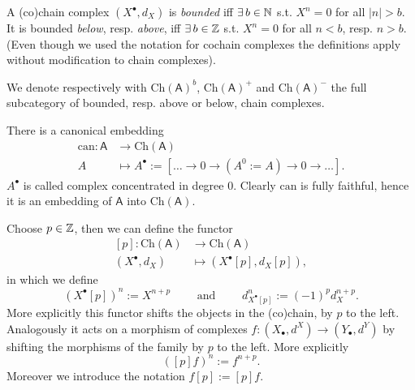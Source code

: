\begin{defn}
	A (co)chain complex $\left(X^{\bullet}, d_X\right)$ is {\em bounded} iff
	$\exists\, b \in \mathbb{N}$ s.t. $X^n = 0$ for all $\left| n \right| > b$.
	It is bounded {\em below}, resp. {\em above}, iff
	$\exists\, b \in \mathbb{Z}$ s.t. $X^n = 0$ for all
	$n < b$, resp. $n > b$.
	(Even though we used the notation for cochain complexes the definitions apply without
	modification to chain complexes).

	We denote respectively with $\mathrm{Ch}(\mathsf{A})^b$, $\mathrm{Ch}(\mathsf{A})^+$
	and $\mathrm{Ch}(\mathsf{A})^-$ the full subcategory of bounded, resp. above or below, chain complexes.
\end{defn}

\begin{defn}
	There is a canonical embedding
	\begin{align}
		\mathrm{can}: \mathsf{A} &\to \mathrm{Ch}(\mathsf{A}) \\
		A &\mapsto A^{\bullet} := \left[ 
		\ldots \to 0 \to (A^0 := A) \to 0 \to \ldots \right]
	.\end{align} 
	$A^{\bullet}$ is called complex concentrated in degree $0$.
	Clearly $\mathrm{can}$ is fully faithful, hence it is an embedding of $\mathsf{A}$ into $\mathrm{Ch}(\mathsf{A})$.
\end{defn}

\begin{defn}
	Choose $p \in \mathbb{Z}$, then we can define the functor
	\begin{align}
		\left[ p \right]: \mathrm{Ch}(\mathsf{A}) &\to \mathrm{Ch}(\mathsf{A}) \\
		\left(X^{\bullet}, d_X\right) &\mapsto \left( X^{\bullet}[p], d_{X}[p] \right)
	,\end{align} 
	in which we define
	\begin{equation}
		\left( X^{\bullet} [p] \right)^n := X^{n+p} \qquad \text{ and } \qquad
		d^n_{X^{\bullet}[p]} := (-1)^{p} d_X^{n+p}
	.\end{equation} 
	More explicitly this functor shifts the objects in the (co)chain, by $p$ to the left.
	Analogously it acts on a morphism of complexes
	$f\colon \left( X_{\bullet}, d^{X} \right) \to \left( Y_{\bullet}, d^{Y} \right)$
	by shifting the morphisms of the family by $p$ to the left.
	More explicitly
	\begin{equation}
		\left( [p]f \right)^n := f^{n+p}
	.\end{equation} 
	Moreover we introduce the notation $f[p] := [p]f$.
\end{defn}

